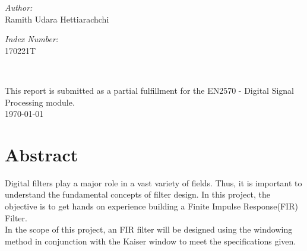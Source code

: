 \documentclass[11pt]{article}
\begin{document}
\begin{center}
\begin{minipage}{0.46\textwidth}
\begin{flushleft}
\emph{Author:}\\	
Ramith Udara Hettiarachchi\\

\end{flushleft}																		%
\end{minipage}		
\begin{minipage}{0.52\textwidth}		
\vspace{-0.6cm}											%
\begin{flushright} \large															%
\emph{Index Number:} \\																	%
170221T\\														%
\end{flushright}																	%
\end{minipage}	
\vspace*{1cm}
 	
 		\flushleft{\textbf{\Large }}\\																		%
\vspace{2cm} 
\end{center}

\begin{center}	
This report is submitted as a partial fulfillment for the EN2570 - Digital Signal Processing module.\\
{\large \today}																	%
\end{center}										  						


\tableofcontents 
\listoffigures
\listoftables
\pagebreak
\newpage
\section{Abstract}

Digital filters play a major role in a vast variety of fields. Thus, it is important to understand the fundamental concepts of filter design. In this project, the objective is to get hands on experience building a Finite Impulse Response(FIR) Filter. \\ In the scope of this project, an FIR filter will be designed using the windowing method in conjunction with the Kaiser window to meet the specifications given.  \\
\end{document}
